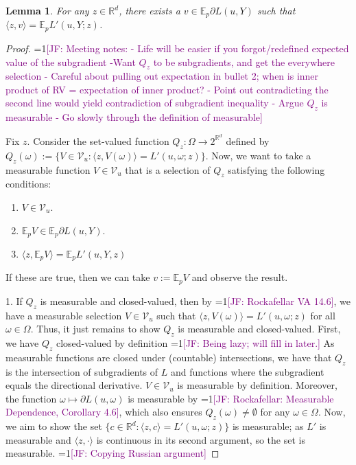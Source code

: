 \documentclass{article}
\newcommand{\Comments}{1}
\newcommand{\mynote}[2]{\ifnum\Comments=1\textcolor{#1}{#2}\fi}
\newcommand{\jessie}[1]{\mynote{purple}{[JF: #1]}}
\newcommand{\reals}{\mathbb{R}}
\newcommand{\B}{\mathcal{B}}
\newcommand{\E}{\mathbb{E}}
\newcommand{\V}{\mathcal{V}}
\newcommand{\inprod}[2]{\langle #1, #2 \rangle}%
\newtheorem{lemma}{Lemma}
\begin{document}
\begin{lemma}
	For any $z \in \reals^d$, there exists a $v \in \E_p \partial L(u,Y)$ such that $\inprod{z}{v} = \E_p L'(u,Y;z)$.
\end{lemma}
\begin{proof}
	\jessie{Meeting notes: - Life will be easier if you forgot/redefined expected value of the subgradient -Want $Q_z$ to be subgradients, and get the everywhere selection - Careful about pulling out expectation in bullet 2; when is inner product of RV = expectation of inner product? - Point out contradicting the second line would yield contradiction of subgradient inequality - Argue $Q_z$ is measurable - Go slowly through the definition of measurable}

Fix $z$.
Consider the set-valued function $Q_z : \Omega \to 2^{\reals^d}$ defined by $Q_z(\omega) := \{V \in \V_u: \inprod{z}{V(\omega)} = L'(u,\omega;z) \}$.
Now, we want to take a measurable function $V \in \V_u$ that is a selection of $Q_z$ satisfying the following conditions:
\begin{enumerate}
	\item $V \in \V_u$.
	\item $\E_p V \in \E_p \partial L(u,Y)$.
	\item $\inprod{z}{\E_p V} = \E_p L'(u,Y,z)$
\end{enumerate} 
If these are true, then we can take $v := \E_p V$ and observe the result.

\bigskip

	
1.  
If $Q_z$ is measurable and closed-valued, then by \jessie{Rockafellar VA 14.6}, we have a measurable selection $V \in \V_u$ such that $\inprod{z}{V(\omega)} = L'(u,\omega; z)$ for all $\omega \in \Omega$.
Thus, it just remains to show $Q_z$ is measurable and closed-valued.
First, we have $Q_z$ closed-valued by definition \jessie{Being lazy; will fill in later.}
As measurable functions are closed under (countable) intersections, we have that $Q_z$ is the intersection of subgradients of $L$ and functions where the subgradient equals the directional derivative.
$V \in \V_u$ is measurable by definition.
Moreover, the function $\omega \mapsto \partial L(u,\omega)$ is measurable by \jessie{Rockafellar: Measurable Dependence, Corollary 4.6}, which also ensures $Q_z(\omega) \neq \emptyset$ for any $\omega \in \Omega$.
Now, we aim to show the set $\{c \in \reals^d: \inprod{z}{c} = L'(u,\omega;z)\}$ is measurable; as $L'$ is measurable and $\inprod{z}{\cdot}$ is continuous in its second argument, so the set is measurable. \jessie{Copying Russian argument}


\end{proof}
\end{document}
